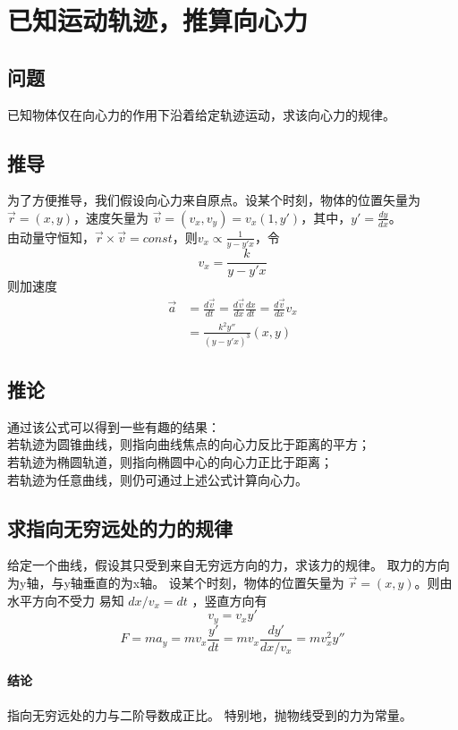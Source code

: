 \section{已知运动轨迹，推算向心力}
\subsection{问题}
已知物体仅在向心力的作用下沿着给定轨迹运动，求该向心力的规律。
\subsection{推导}
为了方便推导，我们假设向心力来自原点。设某个时刻，物体的位置矢量为 $ \vec{r} =(x,y) $，速度矢量为 $ \vec{v}=(v_x,v_y)=v_x (1,y') $，其中，$ y'=\frac{dy}{dx} $。
\\
由动量守恒知，$ \vec{r}\times\vec{v}=const $，则$ v_x\propto\frac{1}{y-y'x} $，令
\begin{equation} v_x=\frac{k}{y-y'x} \end{equation}
则加速度
\begin{equation}
  \begin{split}
    \vec{a} &= \frac{d\vec{v}}{dt} = \frac{d\vec{v}}{dx} \frac{dx}{dt} = \frac{d\vec{v}}{dx} v_x \\
    &= \frac{k^2 y''}{(y-y'x)^3} (x,y)
  \end{split}
\end{equation}
\subsection{推论}
\noindent
通过该公式可以得到一些有趣的结果：
\\若轨迹为圆锥曲线，则指向曲线焦点的向心力反比于距离的平方；
\\若轨迹为椭圆轨道，则指向椭圆中心的向心力正比于距离；
\\若轨迹为任意曲线，则仍可通过上述公式计算向心力。
\subsection{求指向无穷远处的力的规律}
给定一个曲线，假设其只受到来自无穷远方向的力，求该力的规律。
取力的方向为y轴，与y轴垂直的为x轴。
设某个时刻，物体的位置矢量为 $ \vec{r} =(x,y) $。则由水平方向不受力
易知 $dx / v_x = dt$ ，竖直方向有
\begin{equation}
  v_y = v_x y'
\end{equation}
\begin{equation}
  F = m a_y = m v_x \frac{y'}{dt} = m v_x \frac{dy'}{dx / v_x} = m v_x^2 y''
\end{equation}
\paragraph{结论}
指向无穷远处的力与二阶导数成正比。
特别地，抛物线受到的力为常量。
